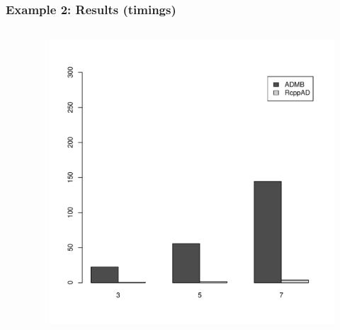 \documentclass[compress]{beamer}
\begin{document}
{
\begin{frame}[plain]
\end{frame}
}

\begin{frame}
  \frametitle{Example 2: Results (timings)}
  \begin{columns}
    \begin{column}{0.5\textwidth}
      \small{
      
      }
    \end{column}
    
    \begin{column}{0.5\textwidth} 
    \begin{figure}[!htb]
      \centering
      \includegraphics[width=1.0\textwidth]{results/timings.pdf}
    \end{figure}

  \end{column}
\end{columns}
 
\end{frame}
\end{document}
